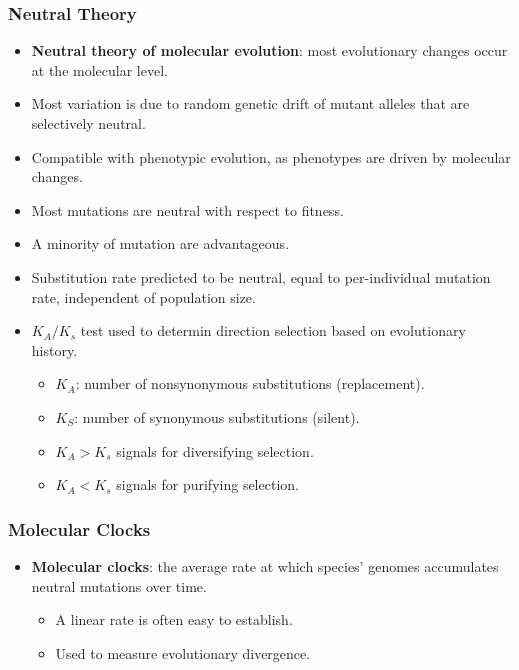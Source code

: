 \documentclass[12pt,a4paper]{article}
\begin{document}
\begin{itemize}
    \subsubsection{Neutral Theory}
        \begin{itemize}
        \item \textbf{Neutral theory of molecular evolution}: most evolutionary changes occur at the molecular level.
        \item Most variation is due to random genetic drift of mutant alleles that are selectively neutral.
        \item Compatible with phenotypic evolution, as phenotypes are driven by molecular changes.
        \item Most mutations are neutral with respect to fitness.
        \item A minority of mutation are advantageous.
        \item Substitution rate predicted to be neutral, equal to per-individual mutation rate, {\color{o-Sun}independent} of population size. 
        \item \(K_A / K_s\) test used to determin direction selection based on evolutionary history.
            \begin{itemize}
                \item \(K_A\): number of nonsynonymous substitutions (replacement).
                \item \(K_S\): number of synonymous substitutions (silent).
                \item {\color{pos}\(K_A > K_s\)} signals for {\color{pos}diversifying selection}.
                \item {\color{neg}\(K_A < K_s\)} signals for {\color{neg}purifying selection}.
            \end{itemize}
        \end{itemize}
    \subsubsection{Molecular Clocks}
    \begin{itemize}
        \item \textbf{Molecular clocks}: the average rate at which species' genomes accumulates {\color{o-Sun}neutral mutations} over time.
        \begin{itemize}
            \item A linear rate is often easy to establish.
            \item Used to measure evolutionary divergence.
        \end{itemize}
    \end{itemize}
\end{itemize}
\end{document}
